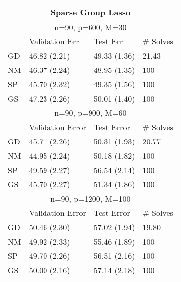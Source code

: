 \documentclass[12pt,letterpaper]{article}
\begin{document}
\begin{table}
	\begin{tabular}{| l | l | l | l | }
		\hline
		\multicolumn{4}{|c|}{Sparse Group Lasso}\\
		\hline
		\multicolumn{4}{|c|}{n=90, p=600, M=30}\\
		\hline
		& Validation Err & Test Err & \# Solves \\
		\hline
		GD & 46.82 (2.21) & 49.33 (1.36)& 21.43\\
		\hline
		NM & 46.37 (2.24) & 48.95 (1.35) & 100 \\
		\hline
		SP &  45.70 (2.32) & 49.35 (1.56) & 100 \\
		\hline
		GS & 47.23 (2.26) & 50.01 (1.40) & 100 \\
		\hline
		\multicolumn{4}{|c|}{n=90, p=900, M=60}\\
		\hline
		 & Validation Error & Test Error & \# Solves \\
		\hline
		GD  & 45.71 (2.26) & 50.31 (1.93) & 20.77\\
		\hline
		NM  & 44.95 (2.24) & 50.18 (1.82) & 100  \\
		\hline
		SP  & 49.59 (2.27) & 56.54 (2.14) & 100 \\
		\hline
		GS & 45.70 (2.27) & 51.34 (1.86) & 100 \\
		\hline
		\multicolumn{4}{|c|}{n=90, p=1200, M=100}\\
		\hline
		&  Validation Error & Test Error & \# Solves \\
		\hline
		GD & 50.46 (2.30) & 57.02 (1.94) & 19.80 \\
		\hline
		NM & 49.92 (2.33) & 55.46 (1.89) & 100 \\
		\hline
		SP  & 49.70 (2.26) & 56.51 (2.16) & 100 \\
		\hline
		GS & 50.00 (2.16) & 57.14 (2.18) & 100 \\
		\hline
	\end{tabular}
	
	\vspace{0.5cm}
	

\end{table}
\end{document}

